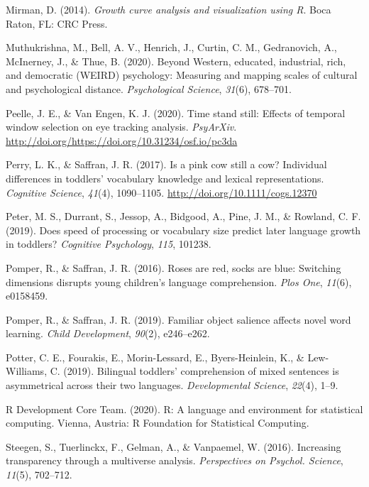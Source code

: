 \documentclass[10pt, letterpaper]{article}
\begin{document}
\leavevmode\hypertarget{ref-Mirman2014}{}%
Mirman, D. (2014). \emph{Growth curve analysis and visualization using
R}. Boca Raton, FL: CRC Press.

\leavevmode\hypertarget{ref-Muthukrishna2020}{}%
Muthukrishna, M., Bell, A. V., Henrich, J., Curtin, C. M., Gedranovich,
A., McInerney, J., \& Thue, B. (2020). Beyond Western, educated,
industrial, rich, and democratic (WEIRD) psychology: Measuring and
mapping scales of cultural and psychological distance.
\emph{Psychological Science}, \emph{31}(6), 678--701.

\leavevmode\hypertarget{ref-Peelle2020}{}%
Peelle, J. E., \& Van Engen, K. J. (2020). Time stand still: Effects of
temporal window selection on eye tracking analysis. \emph{PsyArXiv}.
\url{http://doi.org/https://doi.org/10.31234/osf.io/pc3da}

\leavevmode\hypertarget{ref-Perry2017}{}%
Perry, L. K., \& Saffran, J. R. (2017). Is a pink cow still a cow?
Individual differences in toddlers' vocabulary knowledge and lexical
representations. \emph{Cognitive Science}, \emph{41}(4), 1090--1105.
\url{http://doi.org/10.1111/cogs.12370}

\leavevmode\hypertarget{ref-peter2019}{}%
Peter, M. S., Durrant, S., Jessop, A., Bidgood, A., Pine, J. M., \&
Rowland, C. F. (2019). Does speed of processing or vocabulary size
predict later language growth in toddlers? \emph{Cognitive Psychology},
\emph{115}, 101238.

\leavevmode\hypertarget{ref-Pomper2016}{}%
Pomper, R., \& Saffran, J. R. (2016). Roses are red, socks are blue:
Switching dimensions disrupts young children's language comprehension.
\emph{Plos One}, \emph{11}(6), e0158459.

\leavevmode\hypertarget{ref-Pomper2019}{}%
Pomper, R., \& Saffran, J. R. (2019). Familiar object salience affects
novel word learning. \emph{Child Development}, \emph{90}(2), e246--e262.

\leavevmode\hypertarget{ref-Potter2019}{}%
Potter, C. E., Fourakis, E., Morin-Lessard, E., Byers-Heinlein, K., \&
Lew-Williams, C. (2019). Bilingual toddlers' comprehension of mixed
sentences is asymmetrical across their two languages.
\emph{Developmental Science}, \emph{22}(4), 1--9.

\leavevmode\hypertarget{ref-RDevelopmentCoreTeam2010}{}%
R Development Core Team. (2020). R: A language and environment for
statistical computing. Vienna, Austria: R Foundation for Statistical
Computing.

\leavevmode\hypertarget{ref-steegenEtAl2016}{}%
Steegen, S., Tuerlinckx, F., Gelman, A., \& Vanpaemel, W. (2016).
Increasing transparency through a multiverse analysis.
\emph{Perspectives on Psychol. Science}, \emph{11}(5), 702--712.
\end{document}
